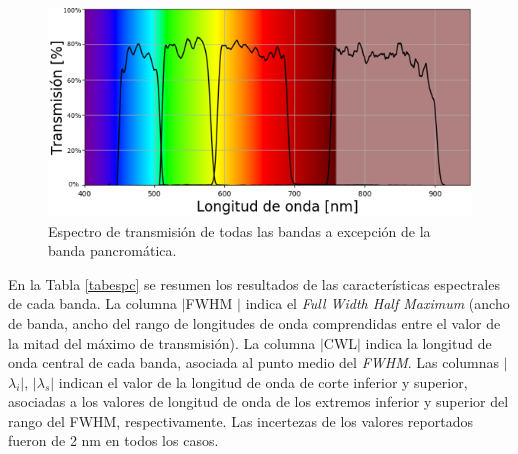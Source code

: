  \begin{figure}[H]
	\centering
	\includegraphics[width=1.0\textwidth]{Figs/microespectrometro/4bandas_conimshowT.png}
	\caption{Espectro de transmisión de todas las bandas a excepción de la banda pancromática.}
	\label{fig:batod}
\end{figure}

En la Tabla \ref{tabespc} se resumen los resultados de las características espectrales de cada banda. La columna  $|$FWHM $|$ indica el \textit{Full Width Half Maximum} (ancho de banda, ancho del rango de longitudes de onda comprendidas entre el valor de la mitad del máximo de transmisión). La columna $|$CWL$|$ indica la longitud de onda central de cada banda, asociada al punto medio del \textit{FWHM}. Las columnas $|$$\lambda_{i}$$|$, $|$$\lambda_{s}$$|$ indican el valor de la longitud de onda de corte inferior y superior, asociadas a los valores de longitud de onda de los extremos inferior y superior del rango del FWHM, respectivamente. Las incertezas de los valores reportados fueron de 2 nm en todos los casos.

